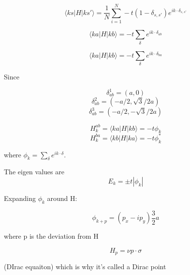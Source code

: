 \documentclass[english, 11pt]{article}
\begin{document}
			\begin{equation}
				\langle k s |H| k s' \rangle =   \frac{1}{N} \sum_{i=1}^N -t (1-\delta_{s,s'}) e^{ik \cdot \delta_{s,s'}} 
			\end{equation}
			
			\begin{equation}
				\langle k a |H| k b \rangle=  -t \sum_{\delta}  e^{i k \cdot \delta_{ab}}
			\end{equation}
			
			\begin{equation}
				\langle k a |H| k b \rangle =  -t \sum_{\delta}  e^{i k \cdot \delta_{ba}}
			\end{equation}
			
			Since
			
						\begin{equation}
				\delta_{ab}^1 = (a,0)
			\end{equation}
			\begin{equation}
				\delta_{ab}^2 = (-a/2,\sqrt{3}/2a)
			\end{equation}
			\begin{equation}
				\delta_{ab}^3 = (-a/2,-\sqrt{3}/2a)
			\end{equation}
			
			\begin{equation}			
				H_k^{ab} = \langle k a |H| k b \rangle =  -t \phi_k
			\end{equation}
			\begin{equation}			
				H_k^{ba} = \langle k b |H| k a \rangle =  -t \phi_k^*
			\end{equation}
			
			where $\phi_k = \sum_\delta e^{i k\cdot \delta}$.
			
			The eigen values are 
			\begin{equation}
				E_k = \pm t |\phi_k|
			\end{equation}
			
			Expanding $\phi_k$ around H:
			
			\begin{equation}
				\phi_{k+p} = (p_x - i p_y) \frac{3}{2} a
			\end{equation}
			
			where p is the deviation from H
			
			\begin{equation}
				H_p = \nu p\cdot \sigma
			\end{equation}
			
			(DIrac equaiton)  which is why it's called a Dirac point
			
\end{document}
